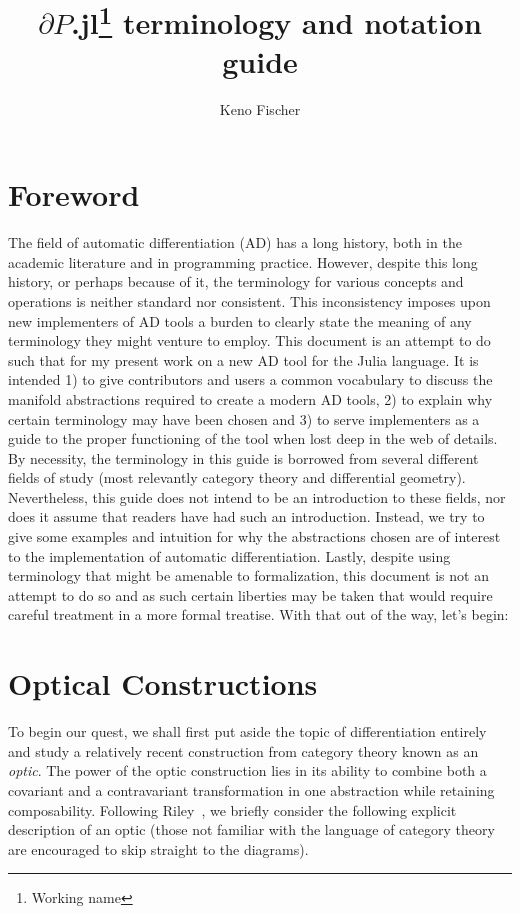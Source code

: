 \documentclass[letterpaper, 10 pt, conference]{ieeeconf}  %
\title{\LARGE \bf
$\partial P$.jl\footnote{Working name} terminology and notation guide}
\author{Keno Fischer}
\begin{document}
\maketitle

\section*{Foreword}

The field of automatic differentiation (AD) has a long history, both in the academic
literature and in programming practice. However, despite this long history,
or perhaps because of it, the terminology for various concepts and operations
is neither standard nor consistent. This inconsistency imposes upon new
implementers of AD tools a burden to clearly state the
meaning of any terminology they might venture to employ. This document is an
attempt to do such that for my present work on a new AD
tool for the Julia language. It is intended 1) to give contributors and users a
common vocabulary to discuss the manifold abstractions required to create a
modern AD tools, 2) to explain why certain terminology may have been
chosen and 3) to serve implementers as a guide to the proper functioning of the
tool when lost deep in the web of details. By necessity, the terminology in
this guide is borrowed from several different fields of study (most relevantly
category theory and differential geometry). Nevertheless, this guide does not
intend to be an introduction to these fields, nor does it assume that readers
have had such an introduction. Instead, we try to give some examples and
intuition for why the abstractions chosen are of interest to the implementation
of automatic differentiation. Lastly, despite using terminology that might
be amenable to formalization, this document is not an attempt to do so and as
such certain liberties may be taken that would require careful treatment in a
more formal treatise. With that out of the way, let's begin:

\section{Optical Constructions}

To begin our quest, we shall first put aside the topic of differentiation
entirely and study a relatively recent construction from category theory known
as an \textit{optic}. The power of the optic construction
lies in its ability to combine both a covariant and a contravariant
transformation in one abstraction while retaining composability.
Following Riley~\cite{riley:optics}, we briefly consider the following
explicit description of an optic (those not familiar with the language
of category theory are encouraged to skip straight to the diagrams).
\end{document}
